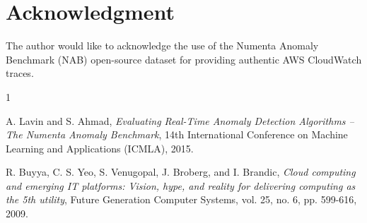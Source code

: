 \documentclass[journal,onecolumn]{IEEEtran}
\begin{document}
\section*{Acknowledgment}
The author would like to acknowledge the use of the Numenta Anomaly Benchmark (NAB) open-source dataset for providing authentic AWS CloudWatch traces.

\begin{thebibliography}{1}

A. Lavin and S. Ahmad, \emph{Evaluating Real-Time Anomaly Detection Algorithms -- The Numenta Anomaly Benchmark}, 14th International Conference on Machine Learning and Applications (ICMLA), 2015.

R. Buyya, C. S. Yeo, S. Venugopal, J. Broberg, and I. Brandic, \emph{Cloud computing and emerging IT platforms: Vision, hype, and reality for delivering computing as the 5th utility}, Future Generation Computer Systems, vol. 25, no. 6, pp. 599-616, 2009.

\end{thebibliography}
\end{document}
